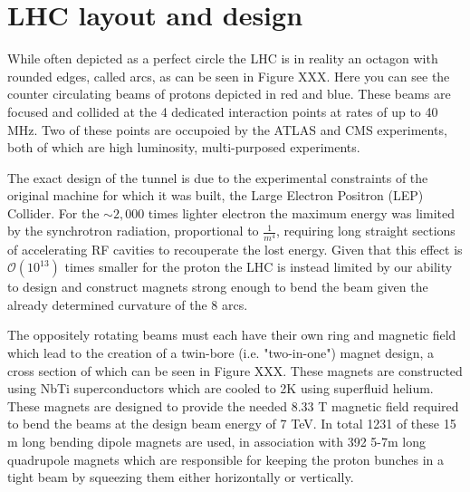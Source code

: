 \section{LHC layout and design} \label{sec:lhc:layout}

While often depicted as a perfect circle the LHC is in reality an octagon with
rounded edges, called arcs, as can be seen in Figure XXX.  Here you can see the
counter circulating beams of protons depicted in red and blue.  These beams are
focused and collided at the 4 dedicated interaction points at rates of up to 40
MHz.  Two of these points are occupoied by the  ATLAS and CMS experiments, both
of which are high luminosity, multi-purposed experiments.

The exact design of the tunnel is due to the experimental constraints of the
original machine for which it was built, the Large Electron Positron (LEP)
Collider.  For the $\sim 2,000$ times lighter electron the maximum energy was
limited by the synchrotron radiation, proportional to $\frac{1}{m^4}$, requiring
long straight sections of accelerating RF cavities to recouperate the lost
energy.  Given that this effect is $\mathcal{O}(10^{13})$ times smaller for the
proton the LHC is instead limited by our ability to design and construct magnets
strong enough to bend the beam given the already determined curvature of the 8
arcs.

The oppositely rotating beams must each  have their own ring and magnetic field
which lead to the creation of a twin-bore (i.e. "two-in-one") magnet design, a
cross section of which can be seen in Figure XXX. These magnets are constructed
using NbTi superconductors which are cooled to 2K using superfluid helium.
These magnets are designed to provide the needed 8.33 T magnetic field required
to bend the beams at the design beam energy of 7 TeV.  In total 1231 of these 15
m long bending dipole magnets are used, in association with 392 5-7m long
quadrupole magnets which are responsible for keeping the proton bunches in a
tight beam by squeezing them either horizontally or vertically.
